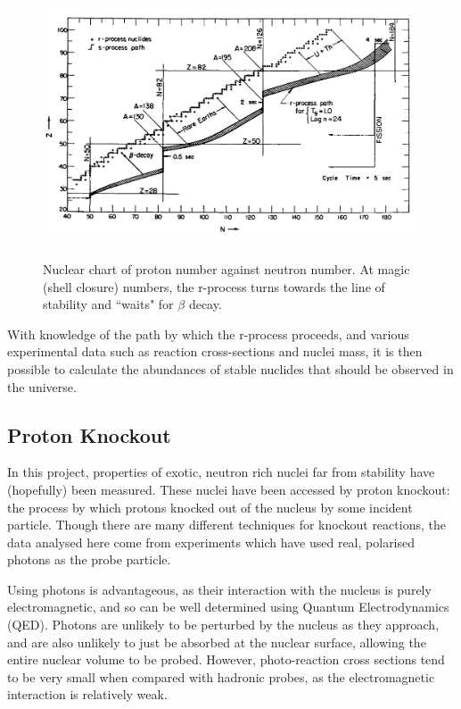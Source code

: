 \documentclass[a4paper,12pt]{article}
\begin{document}
\begin{figure}[ht]
\label{fig:path}
\centering
\includegraphics[height=8cm]{RProcessPath}
\caption{Nuclear chart of proton number against neutron number. At magic (shell closure) numbers, the r-process turns towards the line of stability and ``waits" for $\beta$ decay\cite{seeger}{}.}
\end{figure}

With knowledge of the path by which the r-process proceeds, and various experimental data such as reaction cross-sections and nuclei mass,  it is then possible to calculate the abundances of stable nuclides that should be observed in the universe\cite{seeger}{}.

\subsection{Proton Knockout}
In this project, properties of exotic, neutron rich nuclei far from stability have (hopefully) been measured. These nuclei have been accessed by proton knockout: the process by which protons knocked out of the nucleus by some incident particle. Though there are many different techniques for knockout reactions, the data analysed here come from experiments which have used real, polarised photons as the probe particle. 

Using photons is advantageous, as their interaction with the nucleus is purely electromagnetic, and so can be well determined using Quantum Electrodynamics (QED). Photons are unlikely to be perturbed by the nucleus as they approach, and are also unlikely to just be absorbed at the nuclear surface, allowing the entire nuclear volume to be probed\cite{robinson}{}. However, photo-reaction cross sections tend to be very small when compared with hadronic probes, as the electromagnetic interaction is relatively weak\cite{robinson}{}.
\end{document}
